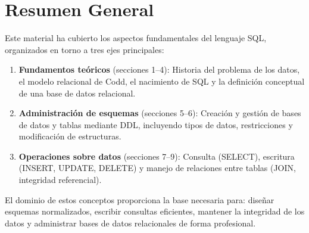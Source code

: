 \documentclass[12pt, a4paper]{article}
\begin{document}
	
	\newpage
	\section*{Resumen General}
	
	Este material ha cubierto los aspectos fundamentales del lenguaje SQL,
	organizados en torno a tres ejes principales:
	
	\begin{enumerate}
		\item \textbf{Fundamentos teóricos} (secciones 1–4): Historia del problema
		de los datos, el modelo relacional de Codd, el nacimiento de SQL y
		la definición conceptual de una base de datos relacional.
		
		\item \textbf{Administración de esquemas} (secciones 5–6): Creación y
		gestión de bases de datos y tablas mediante DDL, incluyendo tipos
		de datos, restricciones y modificación de estructuras.
		
		\item \textbf{Operaciones sobre datos} (secciones 7–9): Consulta (SELECT),
		escritura (INSERT, UPDATE, DELETE) y manejo de relaciones entre
		tablas (JOIN, integridad referencial).
		
	\end{enumerate}
	
	El dominio de estos conceptos proporciona la base necesaria para:
	diseñar esquemas normalizados, escribir consultas eficientes, mantener
	la integridad de los datos y administrar bases de datos relacionales
	de forma profesional.
	
	\newpage
	\printbibliography
	
\end{document}
